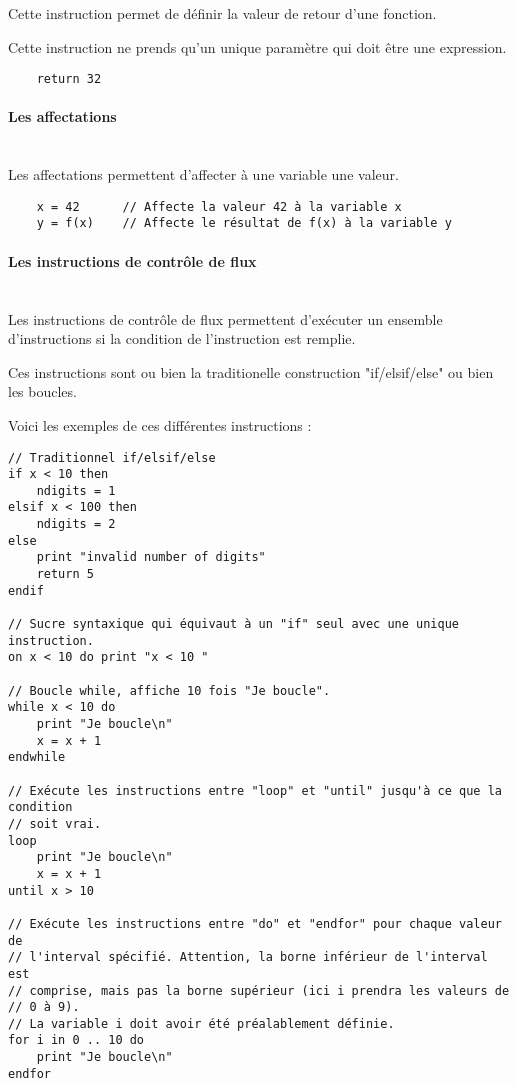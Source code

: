 Cette instruction permet de définir la valeur de retour d'une fonction.

Cette instruction ne prends qu'un unique paramètre qui doit être une
expression.


\begin{verbatim}
    return 32
\end{verbatim}


\paragraph{Les affectations}\mbox{} \\

Les affectations permettent d'affecter à une variable une valeur.

\begin{verbatim}
    x = 42      // Affecte la valeur 42 à la variable x
    y = f(x)    // Affecte le résultat de f(x) à la variable y
\end{verbatim}


\paragraph{Les instructions de contrôle de flux}\mbox{} \\

Les instructions de contrôle de flux permettent d'exécuter un ensemble
d'instructions si la condition de l'instruction est remplie.

Ces instructions sont ou bien la traditionelle construction "if/elsif/else" ou
bien les boucles.

Voici les exemples de ces différentes instructions :
\begin{verbatim}
// Traditionnel if/elsif/else
if x < 10 then
    ndigits = 1
elsif x < 100 then
    ndigits = 2
else
    print "invalid number of digits"
    return 5
endif

// Sucre syntaxique qui équivaut à un "if" seul avec une unique instruction.
on x < 10 do print "x < 10 "

// Boucle while, affiche 10 fois "Je boucle".
while x < 10 do
    print "Je boucle\n"
    x = x + 1
endwhile

// Exécute les instructions entre "loop" et "until" jusqu'à ce que la condition
// soit vrai.
loop
    print "Je boucle\n"
    x = x + 1
until x > 10

// Exécute les instructions entre "do" et "endfor" pour chaque valeur de
// l'interval spécifié. Attention, la borne inférieur de l'interval est
// comprise, mais pas la borne supérieur (ici i prendra les valeurs de
// 0 à 9).
// La variable i doit avoir été préalablement définie.
for i in 0 .. 10 do
    print "Je boucle\n"
endfor
\end{verbatim}



